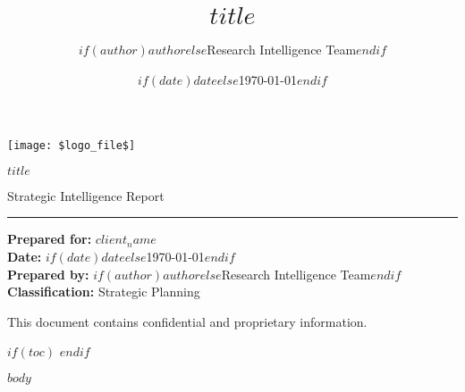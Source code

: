 \documentclass[11pt]{article}
\title{$title$}
\author{$if(author)$$author$$else$Research Intelligence Team$endif$}
\date{$if(date)$$date$$else$\today$endif$}
\begin{document}
\begin{titlepage}
    \centering
    \vspace*{0.5in}
    
    \texttt{[image: \$logo\_file\$]}
    
    \vspace{1in}
    
    {\Huge\bfseries\color{DuarteBlue} $title$ \par}
    
    \vspace{0.5in}
    
    {\Large\color{DuarteGray} Strategic Intelligence Report \par}
    
    \vspace{0.8in}
    
    \textcolor{DuarteBlue}{\rule{4in}{2pt}}
    
    \vspace{0.8in}
    
    {\large
    \textbf{Prepared for:} $client_name$ \\[0.3cm]
    \textbf{Date:} $if(date)$$date$$else$\today$endif$ \\[0.3cm]
    \textbf{Prepared by:} $if(author)$$author$$else$Research Intelligence Team$endif$ \\[0.3cm]
    \textbf{Classification:} Strategic Planning
    }
    
    \vfill
    
    {\small\color{DuarteGray}
    This document contains confidential and proprietary information.
    }
    
\end{titlepage}

\thispagestyle{empty}
\setcounter{page}{1}

$if(toc)$
\tableofcontents
\newpage
$endif$

$body$
\end{document}
